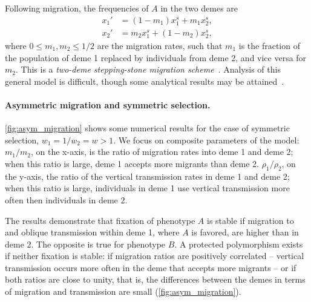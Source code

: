 \documentclass[14pt]{extarticle}
\begin{document}
Following migration, the frequencies of $A$ in the two demes are
\begin{equation} \label{eq:migration_model_migration}
\begin{aligned}
x_1' &= (1-m_1) x_1^s + m_1 x_2^s, \\
x_2' &= m_2 x_1^s + (1-m_2) x_2^s,
\end{aligned}
\end{equation}
where $0 \le m_1, m_2 \le 1/2$ are the migration rates, such that $m_1$ is the fraction of the population of deme 1 replaced by individuals from deme 2, and vice versa for $m_2$.
This is a \emph{two-deme stepping-stone migration scheme}~\citep[][eq.~2.17]{Karlin1982}.
Analysis of this general model is difficult, though some analytical results may be attained~\citep[see~Principle~6.1]{Karlin1982}.

\paragraph{Asymmetric migration and symmetric selection.}

\autoref{fig:asym_migration} shows some numerical results for the case of symmetric selection{\color{red},} $w_1=1/w_2=w>1$.
We focus on composite parameters of the model:
$m_1/m_2$, on the x-axis, is the ratio of migration rates into deme 1 and deme 2; when this ratio is large, deme 1 accepts more migrants than deme 2.
$\rho_1/\rho_2$, on the y-axis{\color{red},} the ratio of the vertical transmission rates in deme 1 and deme 2; when this ratio is large, individuals in deme 1 use vertical transmission more often then individuals in deme 2.

The results demonstrate that fixation of phenotype $A$ is stable if migration to and oblique transmission within deme 1, where $A$ is favored, are higher than in deme 2.
The opposite is true for phenotype $B$.
A protected polymorphism exists if neither fixation is stable: if migration ratios are positively correlated -- vertical transmission occurs more often in the deme that accepts more migrants -- or if both ratios are close to unity, that is, the differences between the demes in terms of migration and transmission are small (\autoref{fig:asym_migration}).
\end{document}
